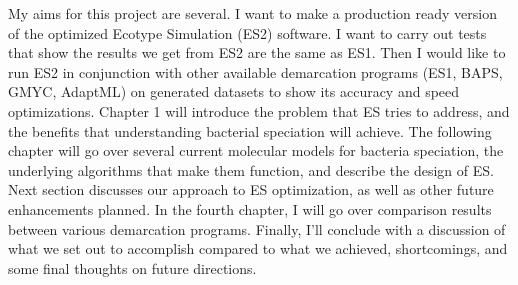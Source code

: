 My aims for this project are several. I want to make a production ready version of the optimized Ecotype Simulation (ES2) software.
I want to carry out tests that show the results we get from ES2 are the same as ES1. 
Then I would like to run ES2 in conjunction with other available demarcation programs (ES1, BAPS, GMYC, AdaptML) on generated datasets to show its accuracy and speed optimizations.
Chapter 1 will introduce the problem that ES tries to address, and the benefits that understanding bacterial speciation will achieve.
The following chapter will go over several current molecular models for bacteria speciation, the underlying algorithms that make them function, and describe the design of ES.
Next section discusses our approach to ES optimization, as well as other future enhancements planned.
In the fourth chapter, I will go over comparison results between various demarcation programs.
Finally, I'll conclude with a discussion of what we set out to accomplish compared to what we achieved, shortcomings, and some final thoughts on future directions.

